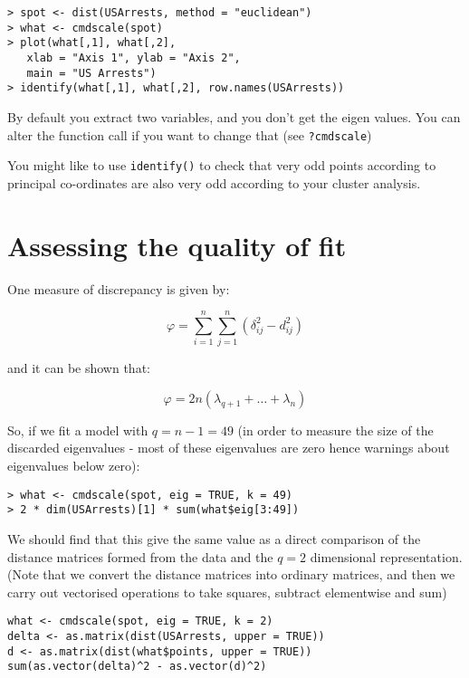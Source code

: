 \singlespacing
\begin{verbatim}
> spot <- dist(USArrests, method = "euclidean")
> what <- cmdscale(spot)
> plot(what[,1], what[,2], 
   xlab = "Axis 1", ylab = "Axis 2", 
   main = "US Arrests")
> identify(what[,1], what[,2], row.names(USArrests))
\end{verbatim}
\onehalfspacing

By default you extract two variables, and you don't get the eigen values.   You can alter the function call if you want to change that (see \texttt{?cmdscale})

You might like to use \texttt{identify()} to check that very odd points according to principal co-ordinates are also very odd according to your cluster analysis.


\section{Assessing the quality of fit}


One measure of discrepancy is given by:

\begin{displaymath}
\varphi = \sum_{i=1}^{n} \sum_{j=1}^{n} (\delta_{ij}^{2} - d_{ij}^{2})
\end{displaymath}

and it can be shown \citep{Mardia+etal:1979}%
 that:

\begin{displaymath}
\varphi = 2n(\lambda_{q+1} + \ldots + \lambda_{n})
\end{displaymath}


So, if we fit a model with $q = n-1 = 49$ (in order to measure the size of the discarded eigenvalues - most of these eigenvalues are zero hence warnings about eigenvalues below zero):

\singlespacing
\begin{verbatim}
> what <- cmdscale(spot, eig = TRUE, k = 49)
> 2 * dim(USArrests)[1] * sum(what$eig[3:49])
\end{verbatim}
\onehalfspacing

We should find that this give the same value as a direct comparison of the distance matrices formed from the data and the $q=2$ dimensional representation.  (Note that we convert the distance matrices into ordinary matrices, and then we carry out vectorised operations to take squares, subtract elementwise and sum)

\singlespacing
\begin{verbatim}
what <- cmdscale(spot, eig = TRUE, k = 2)
delta <- as.matrix(dist(USArrests, upper = TRUE))
d <- as.matrix(dist(what$points, upper = TRUE))
sum(as.vector(delta)^2 - as.vector(d)^2)
\end{verbatim}
\onehalfspacing


